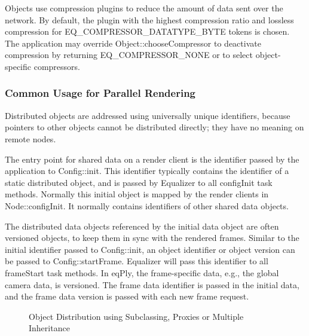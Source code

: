 \documentclass[10pt,a4]{scrartcl}
\begin{document}
Objects use compression plugins to reduce the amount of data sent over the
network. By default, the plugin with the highest compression ratio and lossless
compression for \textsf{EQ\_COMPRESSOR\_DATATYPE\_BYTE} tokens is chosen. The
application may override \textsf{Object::chooseCompressor} to deactivate
compression by returning \textsf{EQ\_COMPRESSOR\_NONE} or to select
object-specific compressors.


\subsubsection{Common Usage for Parallel Rendering}

Distributed objects are addressed using universally unique identifiers, because
pointers to other objects cannot be distributed directly; they have no meaning
on remote nodes.

The entry point for shared data on a render client is the identifier passed by
the application to \textsf{Config::init}. This identifier typically contains the
identifier of a static distributed object, and is passed by Equalizer to all
\textsf{configInit} task methods. Normally this initial object is mapped by the
render clients in \textsf{Node::configInit}. It normally contains identifiers of
other shared data objects.

The distributed data objects referenced by the initial data object are
often versioned objects, to keep them in sync with the rendered
frames. Similar to the initial identifier passed to
\textsf{Config::init}, an object identifier or object version can be
passed to \textsf{Config::startFrame}. Equalizer will pass this
identifier to all \textsf{frameStart} task methods. In \textsf{eqPly},
the frame-specific data, e.g., the global camera data, is versioned. The
frame data identifier is passed in the initial data, and the frame data
version is passed with each new frame request.

\begin{figure}[h!t]
  \hfil
  \hfil
  {\caption{\label{fObjectDist}Object Distribution using Subclassing,
      Proxies or Multiple Inheritance}}
\end{figure}
\end{document}
